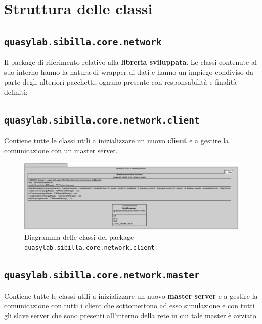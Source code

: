 

\section{Struttura delle classi}

\subsection{\texttt{quasylab.sibilla.core.network}}
Il package di riferimento relativo alla \textbf{libreria sviluppata}. Le classi contenute al suo interno hanno la natura di wrapper di dati e hanno un impiego condiviso da parte degli ulteriori pacchetti, ognuno presente con responsabilità e finalità definiti:

\subsection{\texttt{quasylab.sibilla.core.network.client}} Contiene tutte le classi utili a inizializzare un nuovo \textbf{client} e a gestire la comunicazione con un master server.

\begin{figure}[H]
    \includegraphics[width=\linewidth]{images/quasylab.sibilla.core.network.client.png}
    \captionsetup{justification=centering}
    \caption{Diagramma delle classi del package \texttt{quasylab.sibilla.core.network.client}}
  \end{figure}

\subsection{\texttt{quasylab.sibilla.core.network.master}} Contiene tutte le classi utili a inizializzare un nuovo \textbf{master server} e a gestire la comunicazione con tutti i client che sottomettono ad esso simulazione e con tutti gli slave server che sono presenti all’interno della rete in cui tale master è avviato.

